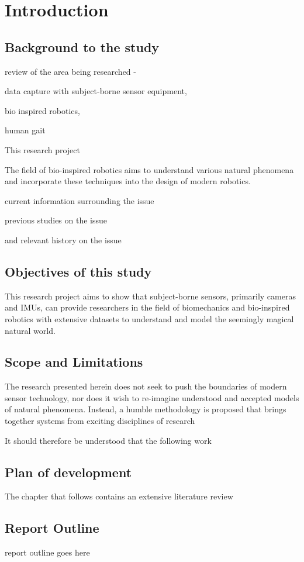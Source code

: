\chapter{Introduction}
\section{Background to the study}
review of the area being researched - 

data capture with subject-borne sensor equipment, 

bio inspired robotics, 

human gait 

This research project 

The field of bio-inspired robotics aims to understand various natural phenomena and incorporate these techniques into the design of modern robotics. 

current information surrounding the issue 


previous studies on the issue

and relevant history on the issue
  
\section{Objectives of this study}

This research project aims to show that subject-borne sensors, primarily cameras and IMUs, can provide researchers in the field of biomechanics and bio-inspired robotics with extensive datasets to understand and model the seemingly magical natural world. 



\section{Scope and Limitations}
The research presented herein does not seek to push the boundaries of modern sensor technology, nor does it wish to re-imagine understood and accepted models of natural phenomena. Instead, a humble methodology is proposed that brings together systems from exciting disciplines of research 

It should therefore be understood that the following work  
  
  
\section{Plan of development}
The chapter that follows contains an extensive literature review
  
\section{Report Outline}
report outline goes here